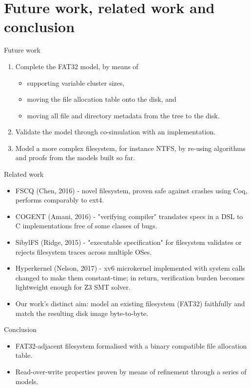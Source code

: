 \documentclass{beamer}
\begin{document}
\section{Future work, related work and conclusion}

\begin{frame}{Future work}
  \begin{enumerate}
  \item Complete the FAT32 model, by means of
    \begin{itemize}
    \item supporting variable cluster sizes,
    \item moving the file allocation table onto the disk, and
    \item moving all file and directory metadata from the tree to the
      disk.
    \end{itemize}
  \item Validate the model through co-simulation with an implementation.
  \item Model a more complex filesystem, for instance NTFS, by
    re-using algorithms and proofs from the models built so far.
  \end{enumerate}
\end{frame}

\begin{frame}{Related work}
  \begin{itemize}
  \item FSCQ (Chen, 2016) - novel filesystem, proven
    safe against crashes using Coq, performs comparably to
    ext4.
  \item COGENT (Amani, 2016) - "verifying compiler" translates specs
    in a DSL to C implementations free of some classes of bugs.
  \item SibylFS (Ridge, 2015) - "executable specification" for
    filesystem validates or rejects filesystem traces across multiple
    OSes.
  \item Hyperkernel (Nelson, 2017) - xv6 microkernel implemented
    with system calls changed to make them constant-time; in return,
    verification burden becomes lightweight enough for Z3 SMT solver.
  \item Our work's distinct aim: model an existing filesystem (FAT32)
    faithfully and match the resulting disk image byte-to-byte.
  \end{itemize}
\end{frame}

\begin{frame}{Conclusion}
  \begin{itemize}
  \item FAT32-adjacent filesystem formalised with
    a binary compatible file allocation table.
  \item Read-over-write properties proven by means of refinement
    through a series of models.
  \end{itemize}
\end{frame}
\end{document}

